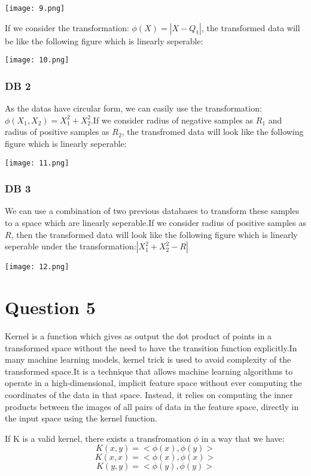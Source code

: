 \documentclass{article}
\begin{document}
\texttt{[image: 9.png]}

If we consider the transformation: $\phi(X) = |X - Q_{1}|$, the transformed data will be like the following figure which is linearly seperable:

\texttt{[image: 10.png]}

\subsubsection*{DB 2}
As the datas have circular form, we can easily use the transformation:$\phi(X_{1}, X_{2}) = X_{1}^{2} + X_{2}^{2}$.If we consider radius of negative samples as $R_{1}$ and
radius of positive samples as $R_{2}$, the transfromed data will look like the following figure which is linearly seperable:

\texttt{[image: 11.png]}

\subsubsection*{DB 3}
We can use a combination of two previous databases to transform these samples to a space which are linearly seperable.If we consider radius of positive samples as $R$, then the transformed data will look like the 
following figure which is linearly seperable under the transformation:$|X_{1}^{2} + X_{2}^{2} - R|$

\texttt{[image: 12.png]}



\section*{Question 5}
Kernel is a function which gives as output the dot product of points in a transformed space without the need to have the transition function explicitly.In many machine learning
models, kernel trick is used to avoid complexity of the transformed space.It is a technique that allows machine learning algorithms to operate in a high-dimensional, implicit feature space without ever computing the coordinates of the data in that space. Instead, it relies on computing the inner products between the images of all pairs of data in the feature space, directly in the input space using the kernel function.

If K is a valid kernel, there exists a transfromation $\phi$ in a way that we have:
\begin{equation*}
    K(x, y) = <\phi{(x)}, \phi{(y)}>
\end{equation*}
\begin{equation*}
    K(x, x) = <\phi{(x)}, \phi{(x)}>
\end{equation*}
\begin{equation*}
    K(y, y) = <\phi{(y)}, \phi{(y)}>
\end{equation*}
\end{document}
